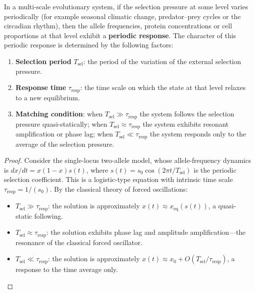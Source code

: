 \begin{theorem}\label{thm:multi_scale_selection_periodicity}
In a multi-scale evolutionary system, if the selection pressure at some level varies periodically (for example seasonal climatic change, predator--prey cycles or the circadian rhythm), then the allele frequencies, protein concentrations or cell proportions at that level exhibit a \textbf{periodic response}. The character of this periodic response is determined by the following factors:
\begin{enumerate}[label=(\roman*)]
    \item \textbf{Selection period} $T_{\text{sel}}$: the period of the variation of the external selection pressure.
    \item \textbf{Response time} $\tau_{\text{resp}}$: the time scale on which the state at that level relaxes to a new equilibrium.
    \item \textbf{Matching condition}: when $T_{\text{sel}} \gg \tau_{\text{resp}}$ the system follows the selection pressure quasi-statically; when $T_{\text{sel}} \approx \tau_{\text{resp}}$ the system exhibits resonant amplification or phase lag; when $T_{\text{sel}} \ll \tau_{\text{resp}}$ the system responds only to the average of the selection pressure.
\end{enumerate}
\end{theorem}

\begin{proof}
Consider the single-locus two-allele model, whose allele-frequency dynamics is $dx/dt = x(1-x) s(t)$, where $s(t) = s_0 \cos(2\pi t/T_{\text{sel}})$ is the periodic selection coefficient. This is a logistic-type equation with intrinsic time scale $\tau_{\text{resp}} = 1/(s_0)$. By the classical theory of forced oscillations:
\begin{itemize}
\item $T_{\text{sel}} \gg \tau_{\text{resp}}$: the solution is approximately $x(t) \approx x_{\text{eq}}(s(t))$, a quasi-static following.
\item $T_{\text{sel}} \approx \tau_{\text{resp}}$: the solution exhibits phase lag and amplitude amplification---the resonance of the classical forced oscillator.
\item $T_{\text{sel}} \ll \tau_{\text{resp}}$: the solution is approximately $x(t) \approx x_0 + O(T_{\text{sel}}/\tau_{\text{resp}})$, a response to the time average only.
\end{itemize}
\end{proof}

